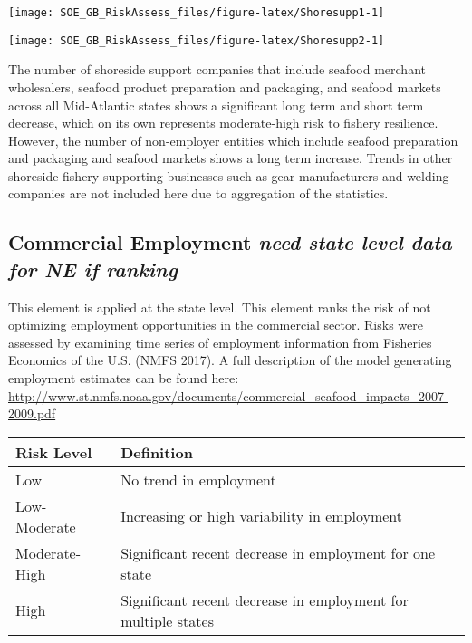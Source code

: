 \documentclass[11pt,]{article}
\let\origfigure\figure
\let\endorigfigure\endfigure
\renewenvironment{figure}[1][2] {
    \expandafter\origfigure\expandafter[H]
} {
    \endorigfigure
}
\begin{document}
\begin{figure}

{\centering \texttt{[image: SOE\_GB\_RiskAssess\_files/figure-latex/Shoresupp1-1]} 

}

\caption{Shoreside support businesses: Number of Companies  \label{shoresupp1}}\label{fig:Shoresupp1}
\end{figure}

\begin{figure}

{\centering \texttt{[image: SOE\_GB\_RiskAssess\_files/figure-latex/Shoresupp2-1]} 

}

\caption{Shoreside support businesses: Number of Nonemployer entities  \label{shoresupp2}}\label{fig:Shoresupp2}
\end{figure}

The number of shoreside support companies that include seafood merchant
wholesalers, seafood product preparation and packaging, and seafood
markets across all Mid-Atlantic states shows a significant long term and
short term decrease, which on its own represents moderate-high risk to
fishery resilience. However, the number of non-employer entities which
include seafood preparation and packaging and seafood markets shows a
long term increase. Trends in other shoreside fishery supporting
businesses such as gear manufacturers and welding companies are not
included here due to aggregation of the statistics.

\subsection{\texorpdfstring{Commercial Employment \emph{need state level
data for NE if
ranking}}{Commercial Employment need state level data for NE if ranking}}\label{commercial-employment-need-state-level-data-for-ne-if-ranking}

This element is applied at the state level. This element ranks the risk
of not optimizing employment opportunities in the commercial sector.
Risks were assessed by examining time series of employment information
from Fisheries Economics of the U.S. (NMFS 2017). A full description of
the model generating employment estimates can be found here:
\url{http://www.st.nmfs.noaa.gov/documents/commercial_seafood_impacts_2007-2009.pdf}

\begin{longtable}[]{@{}ll@{}}
\toprule
Risk Level & Definition\tabularnewline
\midrule
\endhead
Low & No trend in employment\tabularnewline
Low-Moderate & Increasing or high variability in
employment\tabularnewline
Moderate-High & Significant recent decrease in employment for one
state\tabularnewline
High & Significant recent decrease in employment for multiple
states\tabularnewline
\bottomrule
\end{longtable}
\end{document}
